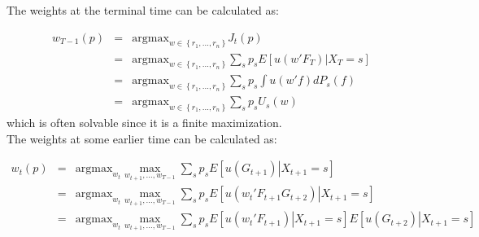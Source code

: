 \documentclass{article}
\begin{document}
The weights at the terminal time can be calculated as:

\begin{eqnarray*}
  w_{T-1}\left(p\right) & = & \mbox{argmax}_{w\in\left\{r_1,\ldots,r_n\right\}} J_t(p)\\
  & = & \mbox{argmax}_{w\in\left\{r_1,\ldots,r_n\right\}} \sum_s p_s E\left[\left.u\!\left(w'F_T\right)\right|X_T=s\right]\\
  & = & \mbox{argmax}_{w\in\left\{r_1,\ldots,r_n\right\}} \sum_s p_s \int u\!\left(w'f\right) dP_s(f)\\
  & = & \mbox{argmax}_{w\in\left\{r_1,\ldots,r_n\right\}}\sum_s p_s U_s\left(w\right)
\end{eqnarray*}
%
which is often solvable since it is a finite maximization.\\

The weights at some earlier time can be calculated as:

\begin{eqnarray*}
  w_t\left(p\right) & = & \mbox{argmax}_{w_t} \max_{w_{t+1}, \ldots, w_{T-1}} \sum_s p_s E\left[\left.u\left(G_{t+1}\right)\right|X_{t+1}=s\right]\\
  & = & \mbox{argmax}_{w_t} \max_{w_{t+1}, \ldots, w_{T-1}} \sum_s p_s E\left[\left.u\left(w_t'F_{t+1} G_{t+2}\right)\right|X_{t+1}=s\right]\\
  & = & \mbox{argmax}_{w_t} \max_{w_{t+1}, \ldots, w_{T-1}} \sum_s p_s E\left[\left.u\left(w_t'F_{t+1}\right)\right|X_{t+1}=s\right]E\left[\left.u\left(G_{t+2}\right)\right|X_{t+1}=s\right]\\
\end{eqnarray*}
\end{document}
